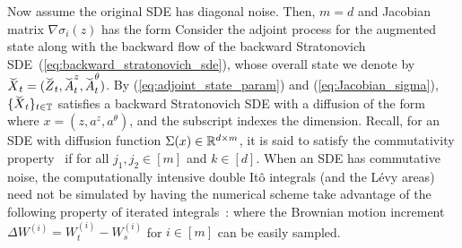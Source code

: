 \documentclass[twoside]{article}
\begin{document}
Now assume the original SDE has diagonal noise. Then, $m=d$ and Jacobian matrix $\nabla \sigma_i(z)$ has the form
Consider the adjoint process for the augmented state along with the backward flow of the backward Stratonovich SDE~(\ref{eq:backward_stratonovich_sde}), whose overall state we denote by $\widecheck{X}_t = ( \widecheck{Z}_t, \widecheck{A}_t^z, \widecheck{A}_t^\theta )$. 
By (\ref{eq:adjoint_state_param}) and (\ref{eq:Jacobian_sigma}), $\{\widecheck{X}_t\}_{t \in \mathbb{T}}$ satisfies a backward Stratonovich SDE with a diffusion of the form
where $x = (z, a^z, a^\theta)$, and the subscript indexes the dimension. 
Recall, for an SDE with diffusion function $\Sigma(x) \in \mathbb{R}^{d \times m}$, it is said to satisfy the commutativity property~\cite{rossler2004runge} if 
for all $j_1, j_2 \in [m]$ and $k \in [d]$.
When an SDE has commutative noise, the computationally intensive double It\^o integrals (and the L\'evy areas) need not be simulated by having the numerical scheme take advantage of the following property of iterated integrals~\cite{ilie2015adaptive}:
where the Brownian motion increment $\Delta W^{(i)} = W_t^{(i)} - W_s^{(i)}$ for $i \in [m]$ can be easily sampled.
\end{document}
